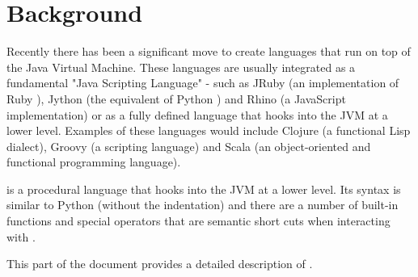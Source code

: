 \chapter{Background}
Recently there has been a significant move to create languages that run on top of the Java Virtual Machine.
These languages are usually integrated as a fundamental "Java Scripting Language" - such as JRuby 
(an implementation of Ruby ), Jython  (the equivalent of Python ) and
Rhino  (a JavaScript  implementation) or as a fully defined language that hooks
into the JVM at a lower level. Examples of these languages would include Clojure  (a functional Lisp dialect),
Groovy  (a scripting language) and Scala  (an object-oriented and functional programming language).

\Reflex is a procedural language that hooks into the JVM at a lower level. Its syntax is similar
to Python (without the indentation) and there are a number of built-in functions and special
operators that are semantic short cuts when interacting with \Rapture.

This part of the document provides a detailed description of \Reflex.
